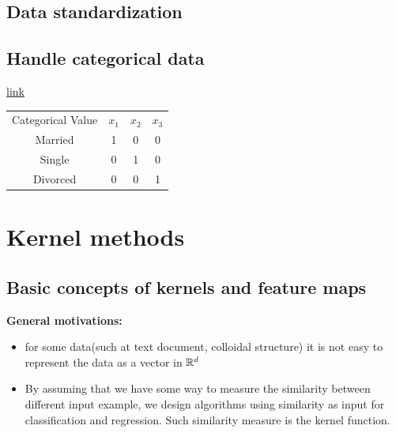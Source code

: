 \begin{refsection}
\subsection{Data standardization}







\subsection{Handle categorical data}

\href{https://www.analyticsvidhya.com/blog/2015/11/easy-methods-deal-categorical-variables-predictive-modeling/}{link}


\begin{table}[H]
	\begin{tabular}{cccc}
		Categorical Value & $x_1$ & $x_2$ & $x_3$ \\
		Married           & 1     & 0     & 0     \\
		Single            & 0     & 1     & 0     \\
		Divorced          & 0     & 0     & 1    
	\end{tabular}
\end{table}












\section{Kernel methods}
\subsection{Basic concepts of kernels and feature maps}
\begin{mdframed}
	\textbf{\cite[481]{murphy2012machine} General motivations:}
	\begin{itemize}
		\item for some data(such at text document, colloidal structure) it is not easy to represent the data as a vector in $\mathbb{R}^d$
		\item By assuming that we have some way to measure the similarity between different input example, we design algorithms using similarity as input for classification and regression. Such similarity measure is the kernel function.
	\end{itemize}
\end{mdframed}



\end{refsection}
